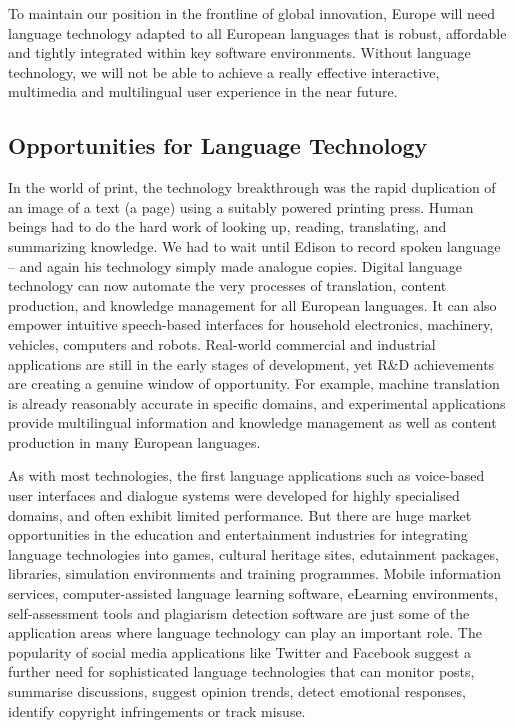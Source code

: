 \begin{multicols}{2}
    To maintain our position in the frontline of global innovation, Europe will need language technology adapted to all European languages that is robust, affordable and tightly integrated within key software environments. Without language technology, we will not be able to achieve a really effective interactive, multimedia and multilingual user experience in the near future.

\subsection{Opportunities for Language Technology}


    In the world of print, the technology breakthrough was the rapid duplication of an image of a text (a page) using a suitably powered printing press. Human beings had to do the hard work of looking up, reading, translating, and summarizing knowledge. We had to wait until Edison to record spoken language – and again his technology simply made analogue copies.
    Digital language technology can now automate the very processes of translation, content production, and knowledge management for all European languages. It can also empower intuitive speech-based interfaces for household electronics, machinery, vehicles, computers and robots. Real-world commercial and industrial applications are still in the early stages of development, yet R\&D achievements are creating a genuine window of opportunity. For example, machine translation is already reasonably accurate in specific domains, and experimental applications provide multilingual information and knowledge management as well as content production in many European languages. 

    As with most technologies, the first language applications such as voice-based user interfaces and dialogue systems were developed for highly specialised domains, and often exhibit limited performance. But there are huge market opportunities in the education and entertainment industries for integrating language technologies into games, cultural heritage sites, edutainment packages, libraries, simulation environments and training programmes. Mobile information services, computer-assisted language learning software, eLearning environments, self-assessment tools and plagiarism detection software are just some of the application areas where language technology can play an important role. The popularity of social media applications like Twitter and Facebook suggest a further need for sophisticated language technologies that can monitor posts, summarise discussions, suggest opinion trends, detect emotional responses, identify copyright infringements or track misuse.


\end{multicols}
